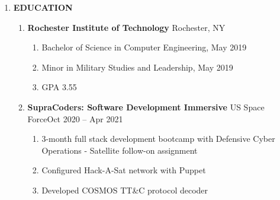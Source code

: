 \documentclass[11pt]{article}
\begin{document}
\begin{center}
\begin{enumerate}[label={}, leftmargin=0pt, parsep=5pt]
    \item {\Large \textbf{EDUCATION}}
    \begin{enumerate}[label={}, itemsep=5pt]
        \item \textbf{Rochester Institute of Technology} \textbar{} Rochester, NY
        \begin{enumerate}[label={--}]
            \item Bachelor of Science in Computer Engineering, May 2019
            \item Minor in Military Studies and Leadership, May 2019
            \item GPA 3.55
        \end{enumerate}
        \item \textbf{SupraCoders: Software Development Immersive} \textbar{} US Space Force\hfill Oct 2020 -- Apr 2021
        \begin{enumerate}[label={--}]
            \item 3-month full stack development bootcamp with Defensive Cyber Operations - Satellite follow-on assignment
            \item Configured Hack-A-Sat network with Puppet
            \item Developed COSMOS TT\&C protocol decoder
        \end{enumerate}
    \end{enumerate}
\end{enumerate}
\end{center}
\end{document}
